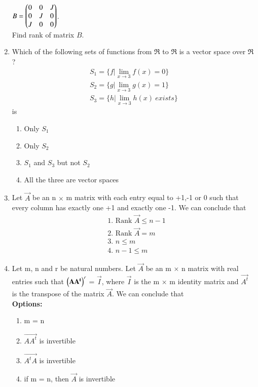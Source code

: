 \begin{enumerate}[label=\thesection.\arabic*.,ref=\thesection.\theenumi]
$B = \begin{pmatrix}0&0&J\\0&J&0\\J&0&0\end{pmatrix}$. \\
Find rank of matrix $B$.
%
\solution

\item Which of the following sets of functions from $\Re$ to $\Re$ is a vector space over $\Re$?
\begin{align}
S_1 = \{f|\lim_{x\to3} f(x) = 0\}\\
S_2 = \{g|\lim_{x\to3} g(x) = 1\}\\
S_3 = \{h|\lim_{x\to3} h(x)~exists\}
\end{align}
is
\begin{enumerate}
\item Only $S_1$ 
\item Only $S_2$
\item $S_1$ and $S_3$ but not $S_2$ 
\item All the three are vector spaces
\end{enumerate}
%
\solution

\item Let $\vec{A}$ be an n $\times$ m matrix with each entry equal to +1,-1 or 0 such that every column has exactly one +1 and exactly one -1. We can conclude that\\
\begin{align}
    &\mbox{1. Rank } \vec{A}\leq n-1\\
    &\mbox{2. Rank } \vec{A}=m\\    
    &\mbox{3. }n\leq m\\
    &\mbox{4. }n-1\leq m
\end{align}
%
%
\solution

\item Let m, n and r be natural numbers. Let $\vec{A}$ be an m $\times$ n matrix with real entries such that $\left(\mathbf{AA^t}\right)^r$ = $\vec{I}$, where $\vec{I}$ is the m $\times$ m identity matrix and $\vec{A^t}$ is the transpose of the matrix $\vec{A}$. We can conclude that\\
\textbf{Options:}
\begin{enumerate}
\item m = n
\item $\vec{AA^t}$ is invertible
\item $\vec{A^tA}$ is invertible
\item if m = n, then $\vec{A}$ is invertible
\end{enumerate}
%
%
\solution



\end{enumerate}
